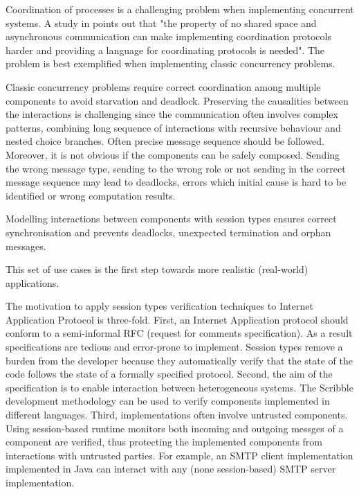  Coordination of processes is a challenging problem when implementing concurrent systems. 
A study in \cite{ActorCoordinationStudy} points out that "the property of no shared space and asynchronous
communication can make implementing coordination protocols harder and providing a language
for coordinating protocols is needed". The problem is best exemplified when implementing classic concurrency problems. 

Classic concurrency problems require correct coordination among multiple components to avoid starvation and deadlock. Preserving the causalities between the interactions is challenging since the communication often involves complex patterns, combining long sequence of interactions with recursive behaviour and nested choice branches.
Often precise message sequence should be followed. Moreover, it is not obvious if the components can be safely composed. Sending the wrong message type, sending to the wrong role or not sending in the correct message sequence may lead to deadlocks, errors which initial cause is hard to be identified or wrong computation results.


Modelling interactions between components with session types ensures correct synchronisation and prevents deadlocks, unexpected termination and orphan messages. 

This set of use cases is the first step towards more realistic (real-world) applications. 

The motivation to apply session types verification techniques to Internet Application Protocol is three-fold. 
First, an Internet Application protocol should conform to a semi-informal RFC (request for comments specification). 
As a result specifications are tedious and error-prone to implement. Session types remove a burden from the developer because they automatically verify that the state of the code follows the state of a formally specified protocol. Second, the aim of the specification is to enable interaction between heterogeneous systems. The Scribble development methodology can be used to verify components implemented in different languages. Third, implementations often involve untrusted components. Using session-based runtime monitors both incoming and outgoing messges of a component are verified, thus protecting the implemented components from interactions with untrusted parties. For example, an SMTP client implementation implemented in Java can interact with any (none session-based) SMTP server implementation.   


